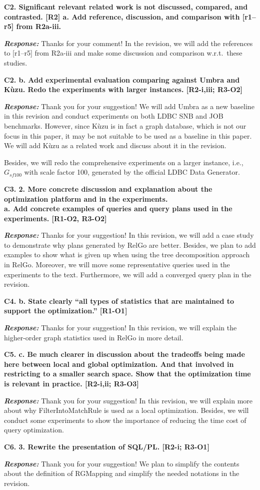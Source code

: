 \textbf{
C2. Significant relevant related work is not discussed, compared, and contrasted. [R2]
a. Add reference, discussion, and comparison with [r1–r5] from R2a-iii.
}

\textbf{\textit{Response: }}
Thanks for your comment! In the revision, we will add the references to [r1--r5] from R2a-iii and make some discussion and comparison w.r.t.~these studies.


\textbf{C2. b. Add experimental evaluation comparing against Umbra and Kùzu. Redo the experiments with larger instances. [R2-i,iii; R3-O2]}

\textbf{\textit{Response: }}
Thank you for your suggestion! We will add Umbra as a new baseline in this revision and conduct experiments on both LDBC SNB and JOB benchmarks. 
However, since Kùzu is in fact a graph database, which is not our focus in this paper, it may be not suitable to be used as a baseline in this paper.
We will add Kùzu as a related work and discuss about it in the revision.

Besides, we will redo the comprehensive experiments on a larger instance, i.e., $G_{sf100}$ with scale factor 100, generated by the official LDBC Data Generator.


\textbf{
C3. 2. More concrete discussion and explanation about the optimization platform and in the experiments. \\
a. Add concrete examples of queries and query plans used in the experiments. [R1-O2, R3-O2]
}

\textbf{\textit{Response: }}
Thanks for your suggestion! In this revision, we will add a case study to demonstrate why plans generated by RelGo are better.
Besides, we plan to add examples to show what is given up when using the tree decomposition approach in RelGo.
Moreover, we will move some representative queries used in the experiments to the text.
Furthermore, we will add a converged query plan in the revision.

\textbf{
C4. b. State clearly “all types of statistics that are maintained to support the optimization.” [R1-O1]}

\textbf{\textit{Response: }}
Thanks for your suggestion! In this revision, we will explain the higher-order graph statistics used in RelGo in more detail.


\textbf{
C5. c. Be much clearer in discussion about the tradeoffs being made here between local and global optimization. And that involved in restricting to a smaller search space. Show that the optimization time is relevant in practice. [R2-i,ii; R3-O3]}

\textbf{\textit{Response: }}
Thank you for your suggestion! In this revision, we will explain more about why FilterIntoMatchRule is used as a local optimization. 
Besides, we will conduct some experiments to show the importance of reducing the time cost of query optimization.


\textbf{
C6. 3. Rewrite the presentation of SQL/PL. [R2-i; R3-O1]
}

\textbf{\textit{Response: }}
Thank you for your suggestion! We plan to simplify the contents about the definition of RGMapping and simplify the needed notations in the revision.

